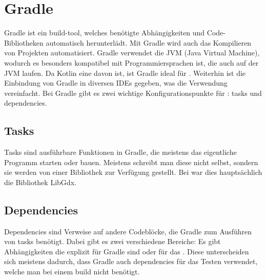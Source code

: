 
\renewcommand{\kapitelautor}{Autor: Felix Zwickelstorfer}
\section{Gradle}\label{sec:gradle}

\renewcommand{\kapitelautor}{Autor: Felix Zwickelstorfer}

Gradle ist ein build-tool, welches benötigte Abhängigkeiten und Code-Bibliotheken automatisch herunterlädt.
Mit Gradle wird auch das Kompilieren von Projekten automatisiert.
Gradle verwendet die JVM (Java Virtual Machine), wodurch es besonders kompatibel mit Programmiersprachen ist, die auch auf der JVM laufen.
Da Kotlin eine davon ist, ist Gradle ideal für \FF.
Weiterhin ist die Einbindung von Gradle in diversen IDEs gegeben, was die Verwendung vereinfacht.
Bei Gradle gibt es zwei wichtige Konfigurationspunkte für \FF: tasks und dependencies.

\subsection{Tasks}\label{subsec:tasks}

Tasks sind ausführbare Funktionen in Gradle, die meistens das eigentliche Programm starten oder bauen.
Meistens schreibt man diese nicht selbst, sondern sie werden von einer Bibliothek zur Verfügung gestellt.
Bei \FF war dies hauptsächlich die Bibliothek LibGdx.

\subsection{Dependencies}\label{subsec:dependencies}

Dependencies sind Verweise auf andere Codeblöcke, die Gradle zum Ausführen von tasks benötigt.
Dabei gibt es zwei verschiedene Bereiche: Es gibt Abhängigkeiten die explizit für Gradle sind oder für das .
Diese unterscheiden sich meistens dadurch, dass Gradle auch dependencies für das Testen verwendet, welche man bei einem build nicht benötigt.

\newpage
\pagebreak
